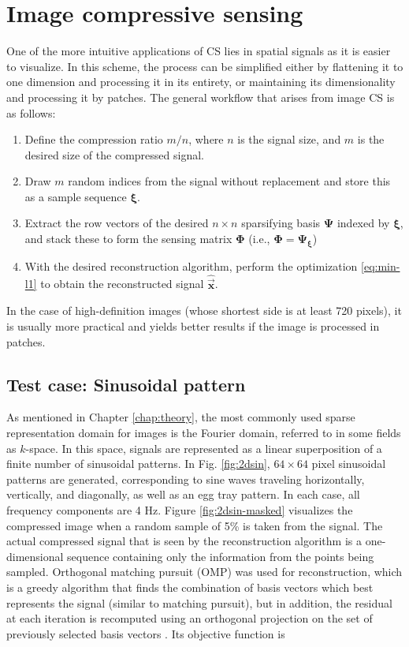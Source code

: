 \chapter{Image compressive sensing}
\label{chap:image-cs}


One of the more intuitive applications of CS lies in spatial signals as it is easier to visualize. In this scheme, the process can be simplified either by flattening it to one dimension and processing it in its entirety, or maintaining its dimensionality and processing it by patches. The general workflow that arises from image CS is as follows:

\begin{enumerate}
	\item Define the compression ratio $m/n$, where $n$ is the signal size, and $m$ is the desired size of the compressed signal.
	\item Draw $m$ random indices from the signal without replacement and store this as a sample sequence $\bm\xi$.
	\item Extract the row vectors of the desired $n \times n$ sparsifying basis $\bm\Psi$ indexed by $\bm\xi$, and stack these to form the sensing matrix $\bm\Phi$ (i.e., $\bm\Phi = \bm\Psi_{\bm\xi}$)
	\item With the desired reconstruction algorithm, perform the optimization \eqref{eq:min-l1} to obtain the reconstructed signal $\bm\hat{\vec{x}}$.
\end{enumerate}

In the case of high-definition images (whose shortest side is at least 720 pixels), it is usually more practical and yields better results if the image is processed in patches.


\section{Test case: Sinusoidal pattern}
\label{sec:2dsin}
As mentioned in Chapter \ref{chap:theory}, the most commonly used sparse representation domain for images is the Fourier domain, referred to in some fields as $k$-space. In this space, signals are represented as a linear superposition of a finite number of sinusoidal patterns. In Fig. \ref{fig:2dsin}, $64 \times 64$ pixel sinusoidal patterns are generated, corresponding to sine waves traveling horizontally, vertically, and diagonally, as well as an egg tray pattern. In each case, all frequency components are 4 Hz. Figure \ref{fig:2dsin-masked} visualizes the compressed image when a random sample of 5\% is taken from the signal. The actual compressed signal that is seen by the reconstruction algorithm is a one-dimensional sequence containing only the information from the points being sampled. Orthogonal matching pursuit (OMP) was used for reconstruction, which is a greedy algorithm that finds the combination of basis vectors which best represents the signal (similar to matching pursuit), but in addition, the residual at each iteration is recomputed using an orthogonal projection on the set of previously selected basis vectors \cite{Mallat1993}. Its objective function is

